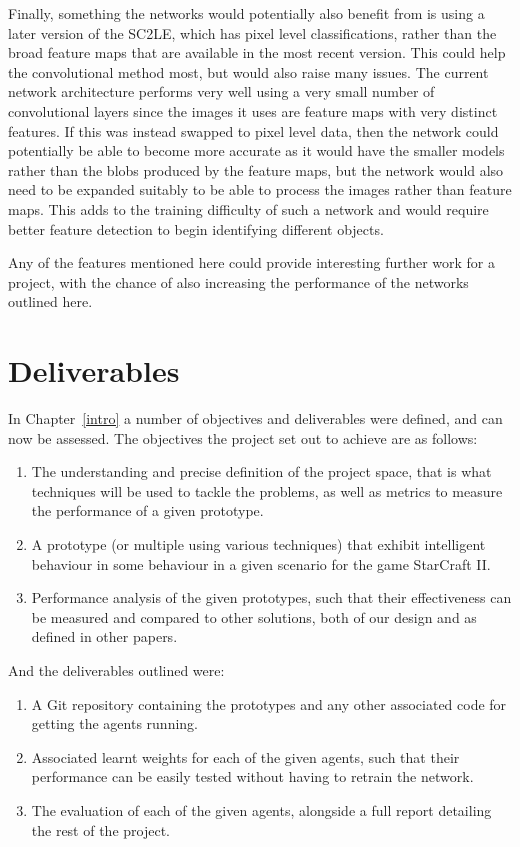 Finally, something the networks would potentially also benefit from is using a
later version of the SC2LE, which has pixel level classifications, rather than
the broad feature maps that are available in the most recent version. This could
help the convolutional method most, but would also raise many issues. The
current network architecture performs very well using a very small number of
convolutional layers since the images it uses are feature maps with very
distinct features. If this was instead swapped to pixel level data, then the
network could potentially be able to become more accurate as it would have the
smaller models rather than the blobs produced by the feature maps, but the
network would also need to be expanded suitably to be able to process the
images rather than feature maps. This adds to the training difficulty of such a network and would require better feature detection to begin identifying different objects. 

Any of the features mentioned here could provide interesting further work for
a project, with the chance of also increasing the performance of the networks
outlined here.

\section{Deliverables}

In Chapter~\ref{intro} a number of objectives and deliverables were defined, and
can now be assessed. The objectives the project set out to achieve are as
follows:

\begin{enumerate}
    \item The understanding and precise definition of the project space, that is
        what techniques will be used to tackle the problems, as well as metrics
        to measure the performance of a given prototype.
    \item A prototype (or multiple using various techniques) that exhibit
        intelligent behaviour in some behaviour in a given scenario for
        the game StarCraft II\@.
    \item Performance analysis of the given prototypes, such that their
        effectiveness can be measured and compared to other solutions, both of
        our design and as defined in other papers.
\end{enumerate}

And the deliverables outlined were:

\begin{enumerate}
    \item A Git repository containing the prototypes and any other associated
        code for getting the agents running.
    \item Associated learnt weights for each of the given agents, such that
        their performance can be easily tested without having to retrain
        the network.
    \item The evaluation of each of the given agents, alongside a full report
        detailing the rest of the project.
\end{enumerate}

